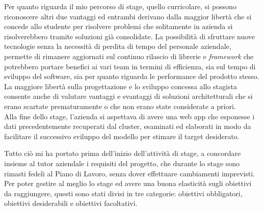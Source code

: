 Per quanto riguarda il mio percorso di stage, quello curricolare, si possono riconoscere altri due vantaggi ed entrambi derivano dalla maggior libertà che si concede allo studente per risolvere problemi che solitamente in azienda si risolverebbero tramite soluzioni già consolidate. La possibilità di sfruttare nuove tecnologie senza la necessità di perdita di tempo del personale aziendale, permette di rimanere aggiornati sul continuo rilascio di librerie e \textit{framework} che potrebbero portare benefici ai vari team in termini di efficienza, sia sul tempo di sviluppo del software, sia per quanto riguarda le performance del prodotto stesso.
La maggiore libertà sulla progettazione e lo sviluppo concessa allo stagista consente anche di valutare vantaggi e svantaggi di soluzioni architetturali che si erano scartate prematuramente o che non erano state considerate a priori.\\

Alla fine dello stage, l'azienda si aspettava di avere una \gls{web app} che esponesse i dati precedentemente recuperati dal \gls{cluster}, esaminati ed elaborati in modo da facilitare il successivo sviluppo del modello per stimare il target desiderato.

Tutto ciò mi ha portato prima dell'inizio dell'attività di stage, a concordare insieme al tutor aziendale i requisiti del progetto, che durante lo stage sono rimasti fedeli al Piano di Lavoro, senza dover effettuare cambiamenti imprevisti.
Per poter gestire al meglio lo stage ed avere una buona elasticità sugli obiettivi da raggiungere, questi sono stati divisi in tre categorie: obiettivi obbligatori, obiettivi desiderabili e obiettivi facoltativi.

\newpage

